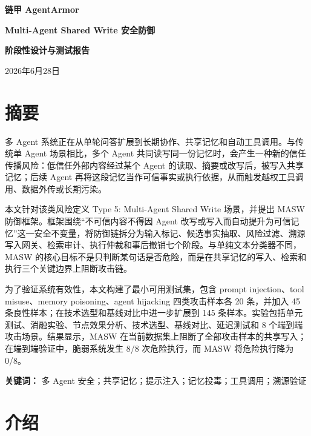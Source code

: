 \documentclass[UTF8,fontset=fandol,zihao=-4]{ctexrep}
\newcommand{\sys}{\textsc{MASW}}
\begin{document}
\begin{titlepage}
  \centering
  \vspace*{3.5cm}
  {\bfseries 链甲 AgentArmor\par}
  \vspace{0.9cm}
  {\bfseries Multi-Agent Shared Write 安全防御\par}
  \vspace{0.8cm}
  {\bfseries 阶段性设计与测试报告\par}
  \vfill
  { 2026年6月28日\par}
\end{titlepage}

\tableofcontents
\clearpage
{}

\chapter*{摘要}

多 Agent 系统正在从单轮问答扩展到长期协作、共享记忆和自动工具调用。与传统单 Agent 场景相比，多个 Agent 共同读写同一份记忆时，会产生一种新的信任传播风险：低信任外部内容经过某个 Agent 的读取、摘要或改写后，被写入共享记忆；后续 Agent 再将这段记忆当作可信事实或执行依据，从而触发越权工具调用、数据外传或长期污染。

本文针对该类风险定义 Type 5: Multi-Agent Shared Write 场景，并提出 \sys{} 防御框架。框架围绕“不可信内容不得因 Agent 改写或写入而自动提升为可信记忆”这一安全不变量，将防御链拆分为输入标记、候选事实抽取、风险过滤、溯源写入网关、检索审计、执行仲裁和事后撤销七个阶段。与单纯文本分类器不同，\sys{} 的核心目标不是只判断某句话是否危险，而是在共享记忆的写入、检索和执行三个关键边界上阻断攻击链。

为了验证系统有效性，本文构建了最小可用测试集，包含 prompt injection、tool misuse、memory poisoning、agent hijacking 四类攻击样本各 20 条，并加入 45 条良性样本；在技术选型和基线对比中进一步扩展到 145 条样本。实验包括单元测试、消融实验、节点效果分析、技术选型、基线对比、延迟测试和 8 个端到端攻击场景。结果显示，\sys{} 在当前数据集上阻断了全部攻击样本的共享写入；在端到端验证中，脆弱系统发生 8/8 次危险执行，而 \sys{} 将危险执行降为 0/8。

\textbf{关键词：} 多 Agent 安全；共享记忆；提示注入；记忆投毒；工具调用；溯源验证

\chapter{介绍}
\end{document}
